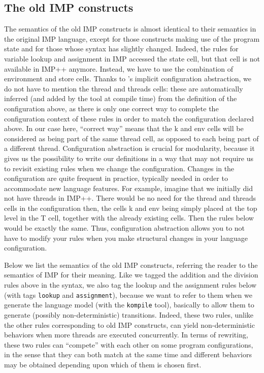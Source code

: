 \documentclass{article}
\begin{document}
\begin{kdefinition}
\begin{module}{}
\begin{kblock}[text]
 \subsection{The old IMP constructs}
The semantics of the old IMP constructs is almost identical to their
semantics in the original IMP language, except for those constructs
making use of the program state and for those whose syntax has slightly
changed.  Indeed, the rules for variable lookup and assignment in IMP
accessed the \textsf{state} cell, but that cell is not available in IMP++
anymore.  Instead, we have to use the combination of environment and store
cells.  Thanks to \K's implicit configuration abstraction, we do not have
to mention the \textsf{thread} and \textsf{threads} cells: these are
automatically inferred (and added by the \K tool at compile time) from the
definition of the configuration above, as there is only one correct
way to complete the configuration context of these rules in order to
match the configuration declared above. In our case here, ``correct way''
means that the \textsf{k} and \textsf{env} cells will be considered as
being part of the same \textsf{thread} cell, as opposed to each being part
of a different thread.  Configuration abstraction is crucial for modularity,
because it gives us the possibility to write our definitions in a way that
may not require us to revisit existing rules when we change the configuration.
Changes in the configuration are quite frequent in practice, typically
needed in order to accommodate new language features.  For example,
imagine that we initially did not have threads in IMP++\@.  There
would be no need for the \textsf{thread} and \textsf{threads} cells in
the configuration then, the cells \textsf{k} and \textsf{env} being simply
placed at the top level in the \textsf{T} cell, together with the
already existing cells.  Then the rules below would be exactly the
same.  Thus, configuration abstraction allows you to not have to
modify your rules when you make structural changes in your language
configuration.

Below we list the semantics of the old IMP constructs, referring the
reader to the \K semantics of IMP for their meaning.  Like we tagged the
addition and the division rules above in the syntax, we also tag the lookup
and the assignment rules below (with tags \texttt{lookup} and
\texttt{assignment}), because we want to refer to them when we generate the
language model (with the \texttt{kompile} tool), basically to allow them to
generate (possibly non-deterministic) transitions.  Indeed, these two rules,
unlike the other rules corresponding to old IMP constructs, can yield
non-deterministic behaviors when more threads are executed concurrently.
In terms of rewriting, these two rules can ``compete'' with each other on
some program configurations, in the sense that they can both match at the
same time and different behaviors may be obtained depending upon which of
them is chosen first. \end{kblock}


\end{module}
\end{kdefinition}
\end{document}
